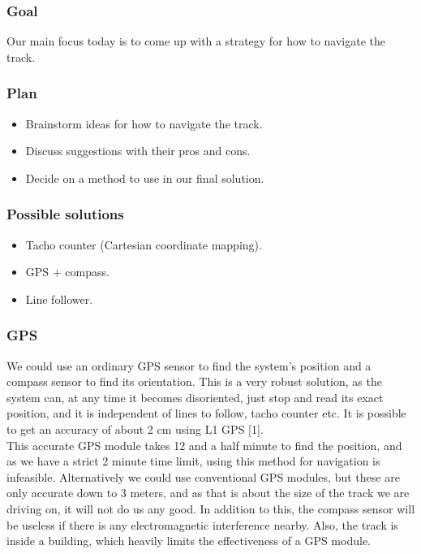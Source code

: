 \subsubsection{Goal}

Our main focus today is to come up with a strategy for how to navigate
the track.

\subsubsection{Plan}

\begin{itemize}
\itemsep1pt\parskip0pt
\item
  Brainstorm ideas for how to navigate the track.
\item
  Discuss suggestions with their pros and cons.
\item
  Decide on a method to use in our final solution.
\end{itemize}

\subsubsection{Possible solutions}

\begin{itemize}
\itemsep1pt\parskip0pt
\item
  Tacho counter (Cartesian coordinate mapping).
\item
  GPS + compass.
\item
  Line follower.
\end{itemize}

\subsubsection{GPS}

We could use an ordinary GPS sensor to find the system's position and a
compass sensor to find its orientation. This is a very robust solution,
as the system can, at any time it becomes disoriented, just stop and
read its exact position, and it is independent of lines to follow, tacho
counter etc. It is possible to get an accuracy of about 2 cm using L1
GPS {[}1{]}.\\This accurate GPS module takes 12 and a half minute to
find the position, and as we have a strict 2 minute time limit, using
this method for navigation is infeasible. Alternatively we could use
conventional GPS modules, but these are only accurate down to 3 meters,
and as that is about the size of the track we are driving on, it will
not do us any good. In addition to this, the compass sensor will be
useless if there is any electromagnetic interference nearby. Also, the
track is inside a building, which heavily limits the effectiveness of a
GPS module.

